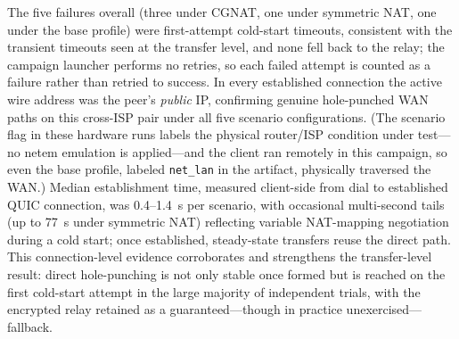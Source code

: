 \documentclass[a4paper,fleqn]{cas-dc}
\begin{document}
The five failures overall (three under CGNAT, one under symmetric NAT, one under the base profile) were first-attempt cold-start timeouts, consistent with the transient timeouts seen at the transfer level, and none fell back to the relay; the campaign launcher performs no retries, so each failed attempt is counted as a failure rather than retried to success. In every established connection the active wire address was the peer's \emph{public} IP, confirming genuine hole-punched WAN paths on this cross-ISP pair under all five scenario configurations. (The scenario flag in these hardware runs labels the physical router/ISP condition under test---no netem emulation is applied---and the client ran remotely in this campaign, so even the base profile, labeled \texttt{net\_lan} in the artifact, physically traversed the WAN.) Median establishment time, measured client-side from dial to established QUIC connection, was 0.4--1.4~s per scenario, with occasional multi-second tails (up to 77~s under symmetric NAT) reflecting variable NAT-mapping negotiation during a cold start; once established, steady-state transfers reuse the direct path. This connection-level evidence corroborates and strengthens the transfer-level result: direct hole-punching is not only stable once formed but is reached on the first cold-start attempt in the large majority of independent trials, with the encrypted relay retained as a guaranteed---though in practice unexercised---fallback.
\end{document}
